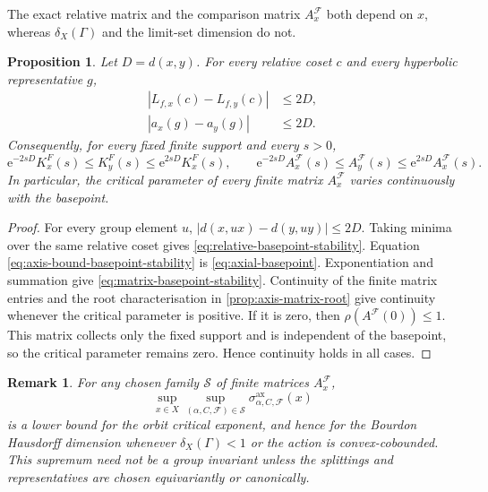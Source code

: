 \documentclass[11pt]{article}
\newtheorem{proposition}[proposition]{Proposition}
\newtheorem{remark}[remark]{Remark}
\theoremstyle{definition}
\newcommand{\ax}{\mathrm{ax}}
\newcommand{\e}{\mathrm e}
\begin{document}
The exact relative matrix and the comparison matrix $A^{\mathcal F}_x$ both depend on $x$, whereas $\delta_X(\Gamma)$ and the limit-set dimension do not.

\begin{proposition}
\label{prop:basepoint-stability}
Let $D=d(x,y)$.  For every relative coset $c$ and every hyperbolic representative $g$,
\begin{align}
 |L_{f,x}(c)-L_{f,y}(c)|&\le2D,\label{eq:relative-basepoint-stability}\\
 |a_x(g)-a_y(g)|&\le2D.\label{eq:axis-bound-basepoint-stability}
\end{align}
Consequently, for every fixed finite support and every $s>0$,
\begin{equation}\label{eq:matrix-basepoint-stability}
 \e^{-2sD}K_x^F(s)\le K_y^F(s)\le\e^{2sD}K_x^F(s),
 \qquad
 \e^{-2sD}A_x^{\mathcal F}(s)\le A_y^{\mathcal F}(s)
 \le\e^{2sD}A_x^{\mathcal F}(s).
\end{equation}
In particular, the critical parameter of every finite matrix $A^{\mathcal F}_x$ varies continuously with the basepoint.
\end{proposition}

\begin{proof}
For every group element $u$,
$|d(x,ux)-d(y,uy)|\le2D$.  Taking minima over the same relative coset gives
\eqref{eq:relative-basepoint-stability}.  Equation
\eqref{eq:axis-bound-basepoint-stability} is \eqref{eq:axial-basepoint}.  Exponentiation and
summation give \eqref{eq:matrix-basepoint-stability}.  Continuity of the finite matrix entries and the root characterisation in
\cref{prop:axis-matrix-root} give continuity whenever the critical parameter is positive.  If
it is zero, then $\rho(A^{\mathcal F}(0))\le1$. This matrix collects only the fixed support
and is independent of the basepoint, so the critical parameter remains zero.  Hence continuity
holds in all cases.
\end{proof}

\begin{remark}
For any chosen family $\mathscr S$ of finite matrices $A^{\mathcal F}_x$,
\[
 \sup_{x\in X}\sup_{(\alpha,C,\mathcal F)\in\mathscr S}
 \sigma^{\ax}_{\alpha,C,\mathcal F}(x)
\]
is a lower bound for the orbit critical exponent, and hence for the Bourdon Hausdorff
dimension whenever $\delta_X(\Gamma)<1$ or the action is convex-cobounded.  This supremum
need not be a group invariant unless the splittings and representatives are chosen
equivariantly or canonically.
\end{remark}
\end{document}
